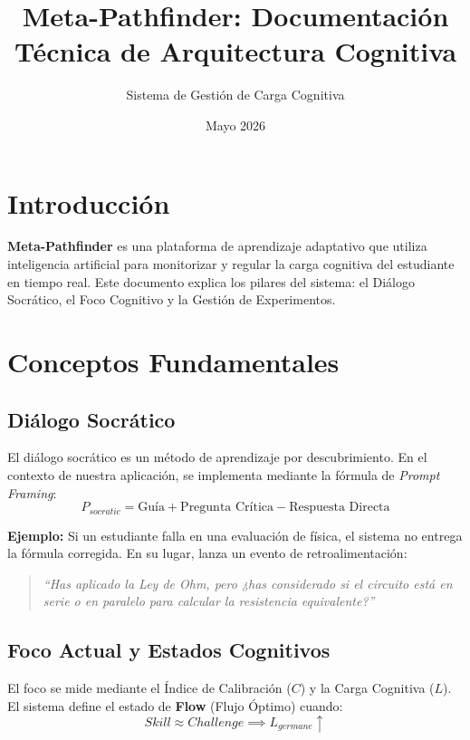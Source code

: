 \documentclass{article}
\title{Meta-Pathfinder: Documentación Técnica de Arquitectura Cognitiva}
\author{Sistema de Gestión de Carga Cognitiva}
\date{Mayo 2026}
\begin{document}
\maketitle

\section{Introducción}
\textbf{Meta-Pathfinder} es una plataforma de aprendizaje adaptativo que utiliza inteligencia artificial para monitorizar y regular la carga cognitiva del estudiante en tiempo real. Este documento explica los pilares del sistema: el Diálogo Socrático, el Foco Cognitivo y la Gestión de Experimentos.

\section{Conceptos Fundamentales}

\subsection{Diálogo Socrático}
El diálogo socrático es un método de aprendizaje por descubrimiento. En el contexto de nuestra aplicación, se implementa mediante la fórmula de \textit{Prompt Framing}:
\begin{equation}
    P_{socratic} = \text{Guía} + \text{Pregunta Crítica} - \text{Respuesta Directa}
\end{equation}

\textbf{Ejemplo:} 
Si un estudiante falla en una evaluación de física, el sistema no entrega la fórmula corregida. En su lugar, lanza un evento de retroalimentación:
\begin{quote}
    \textit{``Has aplicado la Ley de Ohm, pero ¿has considerado si el circuito está en serie o en paralelo para calcular la resistencia equivalente?''}
\end{quote}

\subsection{Foco Actual y Estados Cognitivos}
El foco se mide mediante el Índice de Calibración ($C$) y la Carga Cognitiva ($L$). El sistema define el estado de \textbf{Flow} (Flujo Óptimo) cuando:
\begin{equation}
    Skill \approx Challenge \implies L_{germane} \uparrow
\end{equation}
\end{document}
